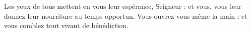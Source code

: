 Les yeux de tous mettent en vous leur espérance, Seigneur :
et vous, vous leur donnez leur nourriture au temps opportun.
\versseparator
Vous ouvrez vous-même la main :
et vous comblez tout vivant de bénédiction.